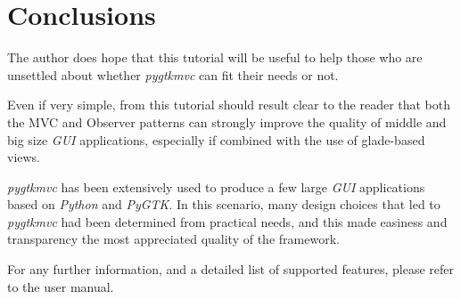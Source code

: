 \documentclass{article}
\newcommand{\kw}[1]{\emph{#1}\xspace}
\newcommand{\appl}[1]{\textsl{#1}\xspace}
\newcommand{\pygtk}{\appl{PyGTK}}
\newcommand{\python}{\appl{Python}}
\newcommand{\gui}{\kw{GUI}}
\newcommand{\pygtkmvc}{\kw{pygtkmvc}}
\begin{document}
\section{Conclusions}
The author does hope that this tutorial will be useful to help those
who are unsettled about whether \pygtkmvc can fit their needs or not.

Even if very simple, from this tutorial should result clear to the
reader that both the MVC and Observer patterns can strongly improve
the quality of middle and big size \gui applications, especially if
combined with the use of glade-based views.

\pygtkmvc has been extensively used to produce a few large \gui
applications based on \python and \pygtk. In this scenario, many
design choices that led to \pygtkmvc had been determined from
practical needs, and this made easiness and transparency the most
appreciated quality of the framework.

For any further information, and a detailed list of supported
features, please refer to the user manual. 
\end{document}
